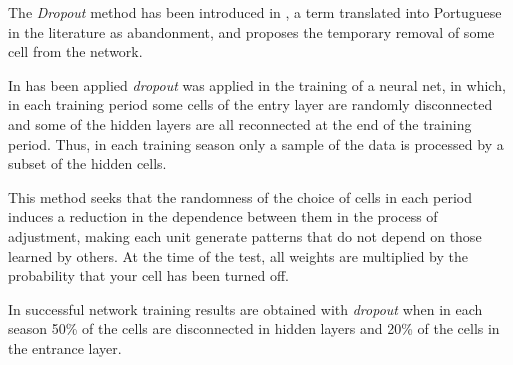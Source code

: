     The \textit{Dropout} method has been introduced in \cite{dropout}, a term translated into Portuguese in the literature as abandonment, and proposes the temporary removal of some cell from the network. 
    
    In \cite{dropoutapp} has been applied \textit{dropout} was applied in the training of a neural net, in which, in each training period some cells of the entry layer are randomly disconnected and some of the hidden layers are all reconnected at the end of the training period. Thus, in each training season only a sample of the data is processed by a subset of the hidden cells.  
    
    This method seeks that the randomness of the choice of cells in each period induces a reduction in the dependence between them in the process of adjustment, making each unit generate patterns that do not depend on those learned by others. At the time of the test, all weights are multiplied by the probability that your cell has been turned off. 
    
    In \cite{dropoutapp} successful network training results are obtained with \textit{dropout} when in each season 50\% of the cells are disconnected in hidden layers and 20\% of the cells in the entrance layer.
    

    

